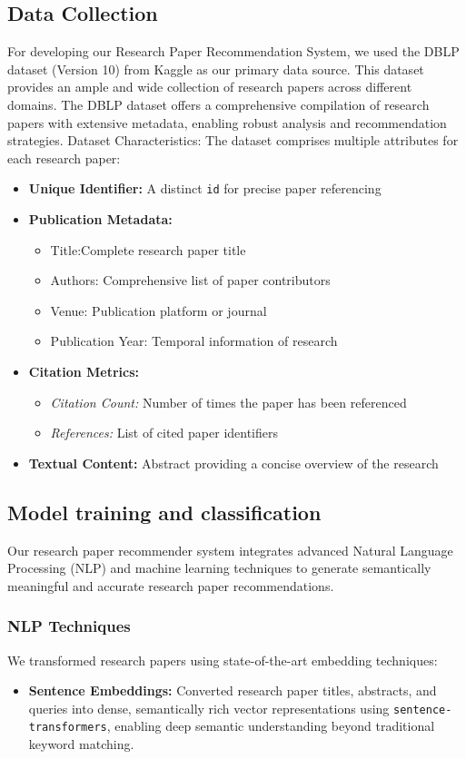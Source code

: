 \documentclass[runningheads]{llncs}
\begin{document}
\subsection{\textbf{Data Collection}}
For developing our Research Paper Recommendation System, we used the DBLP dataset (Version 10) from Kaggle as our primary data source. This dataset provides an ample and wide collection of research papers across different domains.
The DBLP dataset offers a comprehensive compilation of research papers with extensive metadata, enabling robust analysis and recommendation strategies. 
Dataset Characteristics:
The dataset comprises multiple attributes for each research paper:
\begin{itemize}
\item \textbf{Unique Identifier:} A distinct \texttt{id} for precise paper referencing
\item \textbf{Publication Metadata:}
\begin{itemize}
\item Title:Complete research paper title
\item Authors: Comprehensive list of paper contributors
\item Venue: Publication platform or journal
\item Publication Year: Temporal information of research
\end{itemize}
\item \textbf{Citation Metrics:}
\begin{itemize}
\item \textit{Citation Count:} Number of times the paper has been referenced
\item \textit{References:} List of cited paper identifiers
\end{itemize}
\item \textbf{Textual Content:} Abstract providing a concise overview of the research
\end{itemize}

\subsection{\textbf{Model training and classification}}
Our research paper recommender system integrates advanced Natural Language Processing (NLP) and machine learning techniques to generate semantically meaningful and accurate research paper recommendations.
\subsubsection*{NLP Techniques}
We transformed research papers using state-of-the-art embedding techniques:
\begin{itemize}
\item \textbf{Sentence Embeddings:} Converted research paper titles, abstracts, and queries into dense, semantically rich vector representations using \texttt{sentence-transformers}, enabling deep semantic understanding beyond traditional keyword matching.
\end{itemize}
\end{document}
